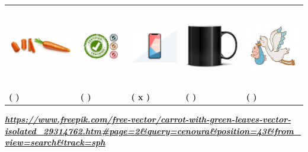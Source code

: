 \begin{escola}
\begin{longtable}[]{@{}lllll@{}}
\toprule
\includegraphics[width=1.36272in,height=0.72875in]{media/image105.jpg} &
\includegraphics[width=0.90977in,height=1.00720in]{media/image106.jpg} &
\includegraphics[width=0.98256in,height=1.40209in]{media/image107.jpg} &
\includegraphics[width=1.12500in,height=1.12500in]{media/image108.jpg} &
\includegraphics[width=1.13713in,height=1.09392in]{media/image109.jpg}\tabularnewline
\textbf{( ) } & \textbf{( )} & \textbf{( x ) } & \textbf{( ) } &
\textbf{( ) }\tabularnewline
\bottomrule
\end{longtable}

\href{https://www.freepik.com/free-vector/carrot-with-green-leaves-vector-isolated_29314762.htm\#page=2\&query=cenoura\&position=43\&from_view=search\&track=sph}{\textbf{\emph{https://www.freepik.com/free-vector/carrot-with-green-leaves-vector-isolated\_29314762.htm\#page=2\&query=cenoura\&position=43\&from\_view=search\&track=sph}}}


\end{escola}
